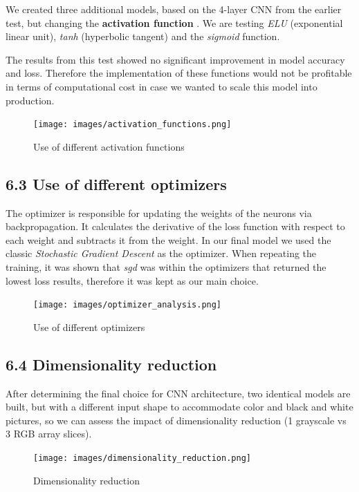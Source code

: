 \documentclass[
  11pt,
]{article}
\begin{document}
We created three additional models, based on the 4-layer CNN from the
earlier test, but changing the \textbf{activation function} . We are
testing \emph{ELU} (exponential linear unit), \emph{tanh} (hyperbolic
tangent) and the \emph{sigmoid} function.

The results from this test showed no significant improvement in model
accuracy and loss. Therefore the implementation of these functions would
not be profitable in terms of computational cost in case we wanted to
scale this model into production.

\begin{figure}
\centering
\texttt{[image: images/activation\_functions.png]}
\caption{Use of different activation functions}
\end{figure}

\hypertarget{use-of-different-optimizers}{%
\subsection{6.3 Use of different
optimizers}\label{use-of-different-optimizers}}

The optimizer is responsible for updating the weights of the neurons via
backpropagation. It calculates the derivative of the loss function with
respect to each weight and subtracts it from the weight. In our final
model we used the classic \emph{Stochastic Gradient Descent} as the
optimizer. When repeating the training, it was shown that \emph{sgd} was
within the optimizers that returned the lowest loss results, therefore
it was kept as our main choice.

\begin{figure}
\centering
\texttt{[image: images/optimizer\_analysis.png]}
\caption{Use of different optimizers}
\end{figure}

\hypertarget{dimensionality-reduction}{%
\subsection{6.4 Dimensionality
reduction}\label{dimensionality-reduction}}

After determining the final choice for CNN architecture, two identical
models are built, but with a different input shape to accommodate color
and black and white pictures, so we can assess the impact of
dimensionality reduction (1 grayscale vs 3 RGB array slices).

\begin{figure}
\centering
\texttt{[image: images/dimensionality\_reduction.png]}
\caption{Dimensionality reduction}
\end{figure}
\end{document}
